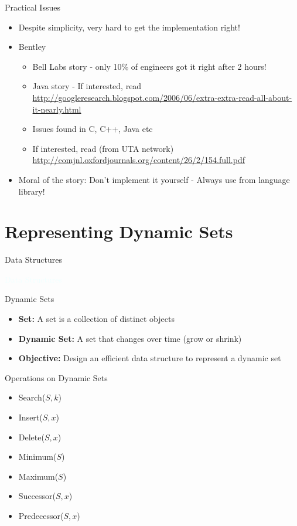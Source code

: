 \documentclass{beamer}
\begin{document}
\begin{frame}{Practical Issues}
\begin{itemize}
\item Despite simplicity, very hard to get the implementation right! 
\item Bentley
\begin{itemize}
    \item Bell Labs story - only 10\% of engineers got it right after 2 hours! 
    \item Java story - If interested, read \url{http://googleresearch.blogspot.com/2006/06/extra-extra-read-all-about-it-nearly.html}
    \item Issues found in C, C++, Java etc
    \item If interested, read (from UTA network) \url{http://comjnl.oxfordjournals.org/content/26/2/154.full.pdf} 
\end{itemize}
\item Moral of the story: Don't implement it yourself - Always use from language library!
\end{itemize}
\end{frame}


\section{Representing Dynamic Sets}

\begin{frame}{Data Structures}
\begin{center}
    {\Huge {\textcolor{azure}{Data Structures}}}
\end{center}
\end{frame}

\begin{frame}{Dynamic Sets}
\begin{itemize}
\item {\bf Set:}  A set is a collection of distinct objects
\item {\bf Dynamic Set:} A set that changes over time (grow or shrink)
\item {\bf Objective:} Design an efficient data structure to represent a dynamic set
\end{itemize}
\end{frame}


\begin{frame}{Operations on Dynamic Sets}
\begin{itemize}
\item Search($S, k$) 
\item Insert($S, x$)
\item Delete($S, x$)
\item Minimum($S$)
\item Maximum($S$)
\item Successor($S, x$)
\item Predecessor($S, x$)
\end{itemize}
\end{frame}
\end{document}
